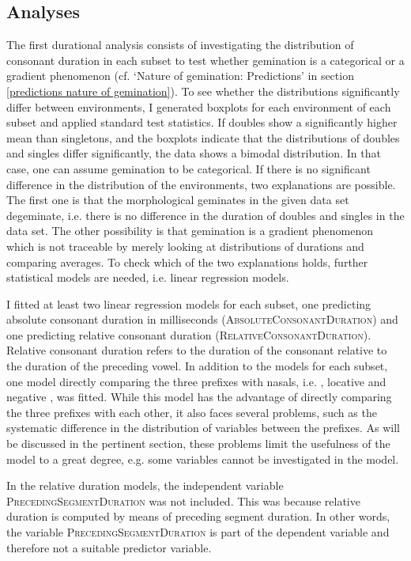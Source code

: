 \subsection{Analyses} \label{analyses dur corpus}


The first durational analysis consists of investigating the distribution of consonant duration in each subset to test whether gemination is a categorical or a gradient phenomenon (cf. `Nature of gemination: Predictions' in section \ref{predictions nature of gemination}). To see whether the distributions significantly differ between environments, I generated boxplots for each environment of each subset and applied standard test statistics. 
If doubles show a significantly higher mean than singletons, and the boxplots indicate that the distributions of doubles and singles differ significantly, the data shows a bimodal distribution. In that case, one can assume gemination to be categorical. 
If there is no significant difference in the distribution of the environments, two explanations are possible. The first one is that the morphological geminates in the given data set degeminate, i.e. there is no difference in the duration of doubles and singles in the data set. The other possibility is that gemination is a gradient phenomenon which is not traceable by merely looking at distributions of durations and comparing averages. To check which of the two explanations holds, further statistical models are needed, i.e. linear regression models. 



I fitted at least two linear regression models for each subset, one predicting absolute consonant duration in milliseconds  (\textsc{AbsoluteConsonantDuration}) and one predicting relative consonant duration (\textsc{RelativeConsonantDuration}). Relative consonant duration refers to the duration of the consonant relative to the duration of the preceding vowel. In addition to the models for each subset, one model directly comparing the three prefixes with nasals, i.e. , locative  and negative , was fitted. While this model has the advantage of directly comparing the three prefixes with each other, it also faces several problems, such as the systematic difference in the distribution of variables between the prefixes. As will be discussed in the pertinent section, these problems limit the usefulness of the model to a great degree, e.g. some variables cannot be investigated in the model.

In the relative duration models, the independent variable \textsc{PrecedingSegmentDuration} was not included. This was because relative duration is computed by means of preceding segment duration. In other words, the variable \textsc{PrecedingSegmentDuration} is part of the dependent variable and therefore not a suitable predictor variable.


